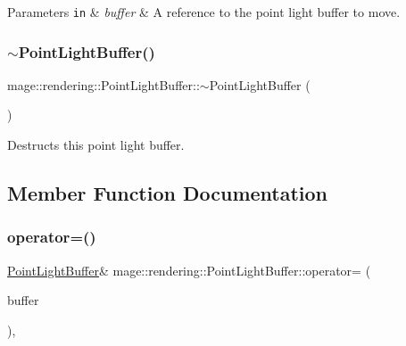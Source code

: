 \begin{DoxyParams}[1]{Parameters}
\mbox{\tt in}  & {\em buffer} & A reference to the point light buffer to move. \\
\hline
\end{DoxyParams}
\mbox{\label{structmage_1_1rendering_1_1_point_light_buffer_ab96d8eab3de782d20ae4cf239c2d45f9}} 
\subsubsection{\texorpdfstring{$\sim$\+Point\+Light\+Buffer()}{~PointLightBuffer()}}
{\footnotesize\ttfamily mage\+::rendering\+::\+Point\+Light\+Buffer\+::$\sim$\+Point\+Light\+Buffer (\begin{DoxyParamCaption}{ }\end{DoxyParamCaption})\hspace{0.3cm}{\ttfamily [default]}}

Destructs this point light buffer. 

\subsection{Member Function Documentation}
\mbox{\label{structmage_1_1rendering_1_1_point_light_buffer_a0464569c115507da0733a185e8968c46}} 
\subsubsection{\texorpdfstring{operator=()}{operator=()}\hspace{0.1cm}{\footnotesize\ttfamily [1/2]}}
{\footnotesize\ttfamily \mbox{\hyperlink{structmage_1_1rendering_1_1_point_light_buffer}{Point\+Light\+Buffer}}\& mage\+::rendering\+::\+Point\+Light\+Buffer\+::operator= (\begin{DoxyParamCaption}\item[{const \mbox{\hyperlink{structmage_1_1rendering_1_1_point_light_buffer}{Point\+Light\+Buffer}} \&}]{buffer }\end{DoxyParamCaption})\hspace{0.3cm}{\ttfamily [default]}, {\ttfamily [noexcept]}}

